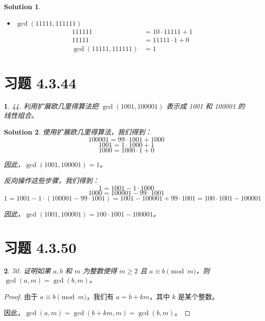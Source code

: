 \documentclass[UTF8]{report}
\newtheorem{solution}{Solution}
\theoremstyle{MyLineTheoremStyle} %
\theoremstyle{MyBlockTheoremStyle} %
\theoremstyle{MySubsubsectionStyle} %
\newtheorem{definition}{}
\begin{document}
\begin{solution}
\begin{itemize}
        \item[f)] \(\gcd(11111, 111111)\)
        \[
        \begin{aligned}
            111111 &= 10 \cdot 11111 + 1 \\
            11111 &= 11111 \cdot 1 + 0 \\
            \gcd(11111, 111111) &= 1
        \end{aligned}
        \]
    \end{itemize}
\end{solution}

\section{习题 4.3.44}

\begin{definition}
    44. 利用扩展欧几里得算法把 \(\gcd(1001, 100001)\) 表示成 1001 和 100001 的线性组合。
\end{definition}

\begin{solution}
    使用扩展欧几里得算法，我们得到：
    \[
    100001 = 99 \cdot 1001 + 1000
    \]
    \[
    1001 = 1 \cdot 1000 + 1
    \]
    \[
    1000 = 1000 \cdot 1 + 0
    \]

    因此，\(\gcd(1001, 100001) = 1\)。

    反向操作这些步骤，我们得到：
    \[
    1 = 1001 - 1 \cdot 1000
    \]
    \[
    1000 = 100001 - 99 \cdot 1001
    \]
    \[
    1 = 1001 - 1 \cdot (100001 - 99 \cdot 1001) = 1001 - 100001 + 99 \cdot 1001 = 100 \cdot 1001 - 100001
    \]

    因此，\(\gcd(1001, 100001) = 100 \cdot 1001 - 100001\)。
\end{solution}

\section{习题 4.3.50}

\begin{definition}
    50. 证明如果 \( a, b \) 和 \( m \) 为整数使得 \( m \geq 2 \) 且 \( a \equiv b \pmod{m} \)，则 \(\gcd(a, m) = \gcd(b, m)\)。
\end{definition}

\begin{proof}
    由于 \( a \equiv b \pmod{m} \)，我们有 \( a = b + km \)，其中 \( k \) 是某个整数。

    因此，\(\gcd(a, m) = \gcd(b + km, m) = \gcd(b, m)\)。
\end{proof}
\end{document}

